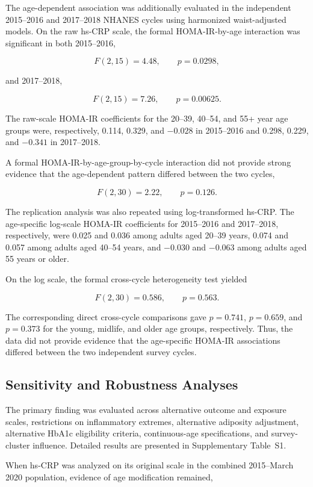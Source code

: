 \documentclass[11pt]{article}
\begin{document}
The age-dependent association was additionally evaluated in the
independent 2015--2016 and 2017--2018 NHANES cycles using harmonized
waist-adjusted models. On the raw hs-CRP scale, the formal
HOMA-IR-by-age interaction was significant in both 2015--2016,

\[
F(2,15)=4.48,
\qquad
p=0.0298,
\]

and 2017--2018,

\[
F(2,15)=7.26,
\qquad
p=0.00625.
\]

The raw-scale HOMA-IR coefficients for the 20--39, 40--54, and
55+ year age groups were, respectively, 0.114, 0.329, and $-0.028$
in 2015--2016 and 0.298, 0.229, and $-0.341$ in 2017--2018.

A formal HOMA-IR-by-age-group-by-cycle interaction did not provide
strong evidence that the age-dependent pattern differed between the
two cycles,

\[
F(2,30)=2.22,
\qquad
p=0.126.
\]

The replication analysis was also repeated using log-transformed
hs-CRP. The age-specific log-scale HOMA-IR coefficients for
2015--2016 and 2017--2018, respectively, were 0.025 and 0.036 among
adults aged 20--39 years, 0.074 and 0.057 among adults aged
40--54 years, and $-0.030$ and $-0.063$ among adults aged 55 years
or older.

On the log scale, the formal cross-cycle heterogeneity test yielded

\[
F(2,30)=0.586,
\qquad
p=0.563.
\]

The corresponding direct cross-cycle comparisons gave $p=0.741$,
$p=0.659$, and $p=0.373$ for the young, midlife, and older age
groups, respectively. Thus, the data did not provide evidence that
the age-specific HOMA-IR associations differed between the two
independent survey cycles.

\subsection{Sensitivity and Robustness Analyses}

The primary finding was evaluated across alternative outcome and exposure
scales, restrictions on inflammatory extremes, alternative adiposity
adjustment, alternative HbA1c eligibility criteria, continuous-age
specifications, and survey-cluster influence. Detailed results are
presented in Supplementary Table~S1.

When hs-CRP was analyzed on its original scale in the combined
2015--March 2020 population, evidence of age modification remained,
\end{document}
